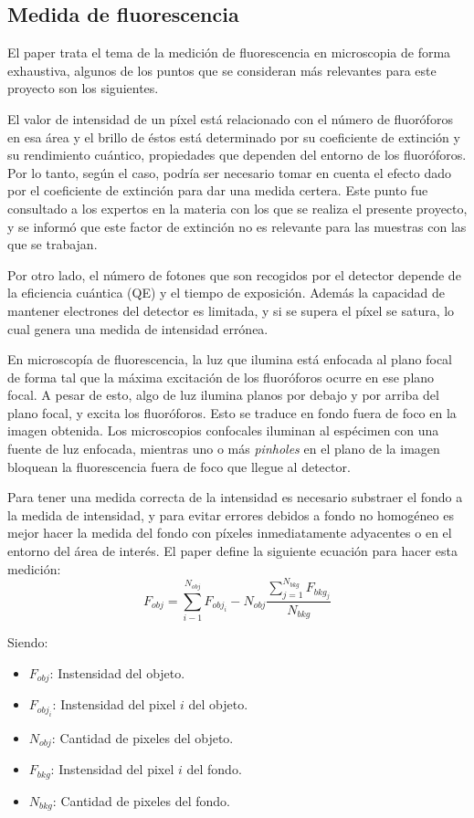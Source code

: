\subsection{Medida de fluorescencia}

El paper \cite{Waters} trata el tema de la medición de fluorescencia en microscopia de forma exhaustiva, algunos de los puntos que se consideran más relevantes para este proyecto son los siguientes.

El valor de intensidad de un píxel está relacionado con el número de fluoróforos en esa área y el brillo de éstos está determinado por su coeficiente de extinción y su rendimiento cuántico, propiedades que dependen del entorno de los fluoróforos. Por lo tanto, según el caso, podría ser necesario tomar en cuenta el efecto dado por el coeficiente de extinción para dar una medida certera. Este punto fue consultado a los expertos en la materia con los que se realiza el presente proyecto, y se informó que este factor de extinción no es relevante para las muestras con las que se trabajan.

Por otro lado, el número de fotones que son recogidos por el detector depende de la eficiencia cuántica (QE) y el tiempo de exposición. Además la capacidad de mantener electrones del detector es limitada, y si se supera el píxel se satura, lo cual genera una medida de intensidad errónea.

En microscopía de fluorescencia, la luz que ilumina está enfocada al plano focal de forma tal que la máxima excitación de los fluoróforos ocurre en ese plano focal. A pesar de esto, algo de luz ilumina planos por debajo y por arriba del plano focal, y excita los fluoróforos. Esto se traduce en fondo fuera de foco en la imagen obtenida.
Los microscopios confocales iluminan al espécimen con una fuente de luz enfocada, mientras uno o más \textit{pinholes} en el plano de la imagen bloquean la fluorescencia fuera de foco que llegue al detector.

Para tener una medida correcta de la intensidad es necesario substraer el fondo a la medida de intensidad, y para evitar errores debidos a fondo no homogéneo es mejor hacer la medida del fondo con píxeles inmediatamente adyacentes o en el entorno del área de interés. El paper\cite{Waters} define la siguiente ecuación para hacer esta medición:
$$F_{obj} = \sum_{i-1}^{N_{obj}}F_{obj_i} -N_{obj}\frac{\sum_{j=1}^{N_{bkg}}F_{bkg_j}}{N_{bkg}}$$

Siendo:

\begin{itemize}
    \item $F_{obj}$: Instensidad del objeto.
    \item $F_{obj_i}$: Instensidad del pixel $i$ del objeto.
    \item $N_{obj}$: Cantidad de pixeles del objeto.
    \item $F_{bkg}$: Instensidad del pixel $i$ del fondo.
    \item $N_{bkg}$: Cantidad de pixeles del fondo.
\end{itemize}
